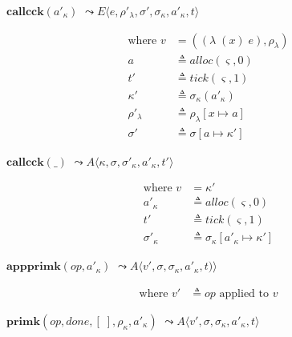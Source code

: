 \documentclass[12pt,draft]{article}
\newcommand{\singlelamsyn}[2]{(\lambda\;(#1)\;#2)}
\begin{document}
\begin{multicols*}{2}
\begin{center}
  $\textbf{callcck}(a'_\kappa)$
  $\leadsto E\langle e , \rho'_\lambda , \sigma' , \sigma_\kappa , a'_\kappa , t \rangle$
\end{center}
\vspace{-7mm}
\begin{align*}
  \text{where } v &= (\singlelamsyn{x}{e} , \rho_{\lambda}) \\
  a &\triangleq alloc(\varsigma, 0) \\
  t' &\triangleq tick(\varsigma, 1) \\
  \kappa' &\triangleq \sigma_\kappa(a'_\kappa) \\
  \rho'_{\lambda} &\triangleq \rho_{\lambda}[x \mapsto a] \\
  \sigma' &\triangleq \sigma[a \mapsto \kappa']
\end{align*}
\begin{center}
  $\textbf{callcck}(\_)$
  $\leadsto A\langle \kappa , \sigma , \sigma'_\kappa , a'_\kappa  , t' \rangle$
\end{center}
\vspace{-7mm}
\begin{align*}
  \text{where }
  v &= \kappa' \\
  a'_\kappa &\triangleq alloc(\varsigma, 0) \\
  t' &\triangleq tick(\varsigma, 1) \\
  \sigma'_\kappa &\triangleq \sigma_\kappa[a'_\kappa \mapsto \kappa']
\end{align*}
\begin{center}
  $\textbf{appprimk}(op, a'_\kappa)$
  $\leadsto A\langle v' , \sigma , \sigma_\kappa , a'_\kappa ,t) \rangle$
\end{center}
\vspace{-7mm}
\begin{align*}
\text{where } v' &\triangleq op \text{ applied to } v
\end{align*}
\begin{center}
  $\textbf{primk}(op, done, [\;], \rho_\kappa, a'_\kappa)$
  $\leadsto A\langle v' , \sigma , \sigma_\kappa , a'_\kappa , t \rangle$
\end{center}
\vspace{-7mm}
\begin{align*}

\end{align*}
\end{multicols*}
\end{document}
